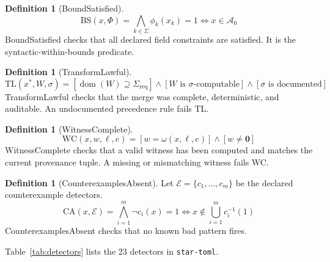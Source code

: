 \documentclass[12pt, letterpaper]{report}
\theoremstyle{plain}
\theoremstyle{definition}
\newtheorem{definition}[theorem]{Definition}
\theoremstyle{remark}
\DeclareMathOperator{\dom}{dom}
\newcommand{\EE}{\mathcal{E}}
\begin{document}
\begin{definition}[BoundSatisfied]
\label{def:bs}
\[
  \mathrm{BS}(x, \Phi) = \bigwedge_{k \in \Sigma} \phi_k(x_k) = 1
  \iff x \in \mathcal{A}_0
\]
BoundSatisfied checks that all declared field constraints are satisfied.
It is the syntactic-within-bounds predicate.
\end{definition}

\begin{definition}[TransformLawful]
\label{def:tl}
\[
  \mathrm{TL}(x^*, W, \sigma) =
  [\dom(W) \supseteq \Sigma_{\mathrm{req}}]
  \wedge [W \text{ is } \sigma\text{-computable}]
  \wedge [\sigma \text{ is documented}]
\]
TransformLawful checks that the merge was complete, deterministic,
and auditable. An undocumented precedence rule fails TL.
\end{definition}

\begin{definition}[WitnessComplete]
\label{def:wc}
\[
  \mathrm{WC}(x, w, \ell, e) = [w = \omega(x, \ell, e)] \wedge [w \neq \bm{0}]
\]
WitnessComplete checks that a valid witness has been computed and matches
the current provenance tuple. A missing or mismatching witness fails WC.
\end{definition}

\begin{definition}[CounterexamplesAbsent]
\label{def:ca}
Let $\EE = \{c_1, \ldots, c_m\}$ be the declared counterexample detectors.
\[
  \mathrm{CA}(x, \EE) = \bigwedge_{i=1}^{m} \lnot c_i(x) = 1
  \iff x \notin \bigcup_{i=1}^{m} c_i^{-1}(1)
\]
CounterexamplesAbsent checks that no known bad pattern fires.
\end{definition}

Table~\ref{tab:detectors} lists the 23 detectors in \texttt{star-toml}.
\end{document}
